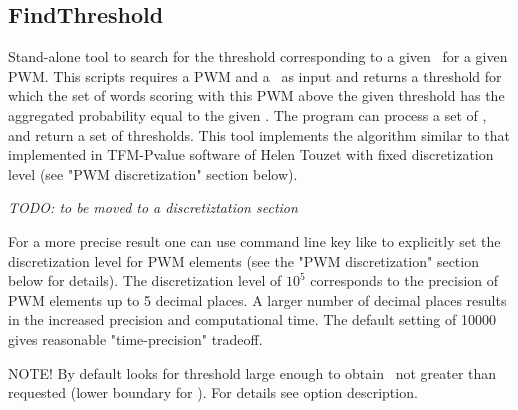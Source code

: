\subsection{FindThreshold}
Stand-alone tool to search for the threshold corresponding to a given \pvalue\ for a given PWM. 
This scripts requires a PWM and a \pvalue\ as input and returns a threshold for which the set of 
words scoring with this PWM above the given threshold has the aggregated probability equal to 
the given \pvalue. The program can process a set of \pvalues, and return a set of thresholds. 
This tool implements the algorithm similar to that implemented in TFM-Pvalue software of 
Helen Touzet  with fixed discretization level (see "PWM 
discretization" section below).

\usageheader
{}


\emph{TODO: to be moved to a discretiztation section}\par
For a more precise result one can use  command line key like  to explicitly set 
the discretization level for PWM elements (see the "PWM discretization" section below for 
details). The discretization level of $10^5$ corresponds to the precision of PWM elements up to 
5 decimal places. A larger number of decimal places results in the increased precision and 
computational time. The default setting of 10000 gives reasonable "time-precision" tradeoff.

NOTE! By default  looks for threshold large enough to obtain \pvalue\ not 
greater than requested (lower boundary for \pvalue). For details see  option description.
